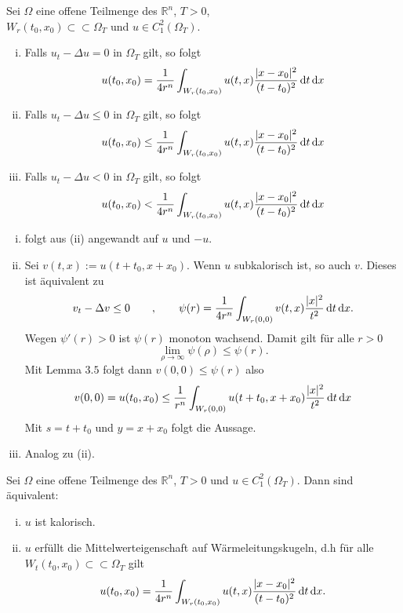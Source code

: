 
\begin{satz}[Mittelwerteigenschaft]
	Sei $\Omega$ eine offene Teilmenge des $\mathbb{R}^n$, $T >0$, \\ $W_r(t_0,x_0) \subset \subset \Omega_T$ und $u \in C^2_1(\Omega_T)$.
	\begin{enumerate}[(i)]
		\item Falls $u_t - \Delta u = 0$ in $\Omega_T$ gilt, so folgt 
		\[
			u(t_0,x_0) = \frac{1}{4r^n} \int_{W_r(t_0,x_0)}^{} u(t,x) \frac{\lvert x-x_0\rvert^2}{(t-t_0)^2} \,\mathrm{d}t \,\mathrm{d}x
		\]
		\item Falls $u_t - \Delta u \leq 0$ in $\Omega_T$ gilt, so folgt \[
			u(t_0,x_0) \leq \frac{1}{4r^n} \int_{W_r(t_0,x_0)}^{} u(t,x) \frac{\lvert x-x_0\rvert^2}{(t-t_0)^2} \,\mathrm{d}t \,\mathrm{d}x
		\] 
		\item Falls $u_t - \Delta u < 0$ in $\Omega_T$ gilt, so folgt 
		\[
			u(t_0,x_0) < \frac{1}{4r^n} \int_{W_r(t_0,x_0)}^{} u(t,x) \frac{\lvert x-x_0\rvert^2}{(t-t_0)^2} \,\mathrm{d}t \,\mathrm{d}x
		\]
	\end{enumerate}
\end{satz}
\begin{beweis}
	\begin{enumerate}[(i)]
		\item folgt aus (ii) angewandt auf $u$ und $-u$.
		\item Sei $v(t,x) := u(t+ t_0 , x +x_0)$. Wenn $u$ subkalorisch ist, so auch $v$. Dieses ist äquivalent zu 
		\[
			v_t - \Delta v \leq 0 \qquad , \qquad \psi(r) = \frac{1}{4r^n} \int_{W_r(0,0)}^{} v(t,x) \frac{\lvert x\rvert^2}{t^2} \,\mathrm{d}t \,\mathrm{d}x. 
		\]
		Wegen $\psi'(r)>0$ ist $\psi(r)$ monoton wachsend. Damit gilt für alle $r >0$
		\[
			\lim_{\rho \to \infty} \psi(\rho) \leq \psi(r).
		\]
		Mit Lemma $3.5$ folgt dann $v(0,0) \leq \psi(r)$ also
		\[
			v(0,0) = u(t_0,x_0) \leq \frac{1}{r^n} \int_{W_r(0,0)}^{} u(t+t_0,x+ x_0) \frac{\lvert x\rvert^2}{t^2} \,\mathrm{d}t \,\mathrm{d}x
		\]
		Mit $s = t+t_0$ und $y = x + x_0$ folgt die Aussage.
		\item Analog zu (ii).
	\end{enumerate}
\end{beweis}

\begin{korollar}
	Sei $\Omega$ eine offene Teilmenge des $\mathbb{R}^n$, $T>0$ und $u \in C^2_1(\Omega_T)$. Dann sind äquivalent:
	\begin{enumerate}[(i)]
		\item $u$ ist kalorisch.
		\item $u$ erfüllt die Mittelwerteigenschaft auf Wärmeleitungskugeln, d.h für alle \\ $W_t(t_0,x_0) \subset \subset \Omega_T$ gilt
		\[
			u(t_0,x_0) = \frac{1}{4r^n} \int_{W_r(t_0,x_0)}^{} u(t,x) \frac{\lvert x-x_0\rvert^2}{(t-t_0)^2} \,\mathrm{d}t \,\mathrm{d}x.
		\]
	\end{enumerate}
\end{korollar}

